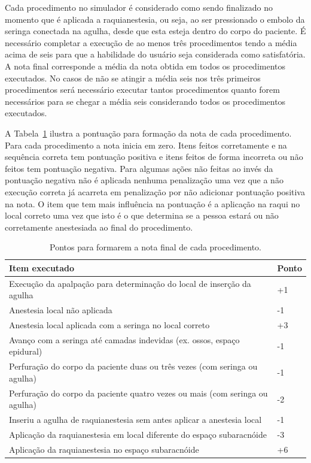 Cada procedimento no simulador é considerado como sendo finalizado no momento que é aplicada a raquianestesia, ou seja, ao ser pressionado o embolo da seringa conectada na agulha, desde que esta esteja dentro do corpo do paciente.
É necessário completar a execução de ao menos três procedimentos tendo a média acima de seis para que a habilidade do usuário seja considerada como satisfatória. A nota final corresponde a média da nota obtida em todos os procedimentos executados. No casos de não se atingir a média seis nos três primeiros procedimentos será necessário executar tantos procedimentos quanto forem necessários para se chegar a média seis considerando todos os procedimentos executados.   

A Tabela~\ref{tab:PontosNotaProcedimento} ilustra a pontuação para formação da nota de cada procedimento. Para cada procedimento a nota inicia em zero. Itens feitos corretamente e na sequência correta tem pontuação positiva e itens feitos de forma incorreta ou não feitos tem pontuação negativa. Para algumas ações não feitas ao invés da pontuação negativa não é aplicada nenhuma penalização uma vez que a não execução correta já acarreta em penalização por não adicionar pontuação positiva na nota. O item que tem mais influência na pontuação é a aplicação na raqui no local correto uma vez que isto é o que determina se a pessoa estará ou não corretamente anestesiada ao final do procedimento.

\begin{table}[!ht]
\begin{center}
\caption{Pontos para formarem a nota final de cada procedimento.}
\label{tab:PontosNotaProcedimento}
\begin{tabular}{|p{0.9\linewidth}|p{0.1\linewidth}|}
\hline
\textbf{Item executado} & \textbf{Ponto}\\
\hline\hline
Execução da apalpação para determinação do local de inserção da agulha & +1\\
Anestesia local não aplicada & -1\\
Anestesia local aplicada com a seringa no local correto & +3\\
Avanço com a seringa até camadas indevidas (ex. ossos, espaço epidural) & -1\\
Perfuração do corpo da paciente duas ou três vezes (com seringa ou agulha) & -1\\
Perfuração do corpo da paciente quatro vezes ou mais (com seringa ou agulha) & -2\\
Inseriu a agulha de raquianestesia sem antes aplicar a anestesia local & -1\\
Aplicação da raquianestesia em local diferente do espaço subaracnóide & -3\\
Aplicação da raquianestesia no espaço subaracnóide & +6\\
\hline
\end{tabular}
\end{center}
\end{table}

